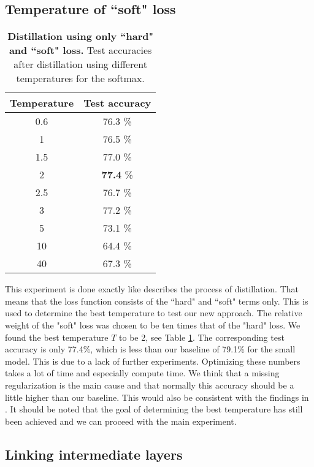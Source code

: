 \documentclass[10pt,twocolumn,letterpaper]{article}
\begin{document}
\subsection{Temperature of ``soft" loss}
\begin{table}[]
	\begin{center}
	\begin{tabular}{|c|c|}
		\hline
		Temperature	&	Test accuracy	\\ \hline
		0.6			&	76.3 \%			\\ \hline
		1			&	76.5 \%			\\ \hline
		1.5			&	77.0 \%			\\ \hline
		2			&	\textbf{77.4} \%\\ \hline
		2.5			&	76.7 \%			\\ \hline
		3			&	77.2 \%			\\ \hline
		5			&	73.1 \%			\\ \hline
		10			&	64.4 \%			\\ \hline
		40			&	67.3 \%			\\ \hline
	\end{tabular}
	\end{center}
	\caption{\textbf{Distillation using only ``hard" and ``soft" loss.} Test accuracies after distillation using different temperatures for the softmax.}
	\label{tab:LL_results}
\end{table}

This experiment is done exactly like \cite{hinton2015distilling} describes the process of distillation. That means that the loss function consists of the ``hard" and ``soft" terms only. This is used to determine the best temperature to test our new approach. The relative weight of the "soft" loss was chosen to be ten times that of the "hard" loss. We found the best temperature $ T $ to be 2, see Table \ref{tab:LL_results}. The corresponding test accuracy is only 77.4\%, which is less than our baseline of 79.1\% for the small model. This is due to a lack of further experiments. Optimizing these numbers takes a lot of time and especially compute time. We think that a missing regularization is the main cause and that normally this accuracy should be a little higher than our baseline. This would also be consistent with the findings in \cite{hinton2015distilling}. It should be noted that the goal of determining the best temperature has still been achieved and we can proceed with the main experiment.

\subsection{Linking intermediate layers}
\end{document}
